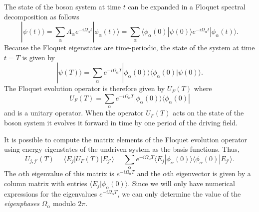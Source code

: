 The  state of the boson system at time $t$ can be expanded in a Floquet spectral decomposition as follows
%
\begin{equation}
|\psi(t)\rangle = \sum_{\alpha}A_{\alpha}e^{-i\Omega_{\alpha}t}|\phi_{\alpha}(t)\rangle
= \sum_{\alpha}\langle \phi_{\alpha}(0)|\psi(0)\rangle e^{-i\Omega_{\alpha}t}|\phi_{\alpha}(t)\rangle .
\end{equation}
%
Because the Floquet eigenstates are time-periodic, the state of the system at time $t=T$ is given by
%
\begin{equation}
|\psi(T)\rangle = \sum_{\alpha} e^{-i\Omega_{\alpha}T}|\phi_{\alpha}(0)\rangle\langle \phi_{\alpha}(0)|\psi(0)\rangle .
\end{equation}
%
The Floquet evolution operator is therefore given  by $U_F(T)$ where
\begin{equation}
U_F(T) = \sum_{\alpha} e^{-i\Omega_{\alpha}T}|\phi_{\alpha}(0)\rangle\langle \phi_{\alpha}(0)|
\end{equation}
%
and is a unitary operator.  When the operator $U_F(T)$ acts on the state of the boson system it evolves it forward in time by one period of the driving field.

It is possible to compute the matrix elements of the Floquet evolution operator using energy eigenstates of the undriven system as the basis functions. Thus, 
%
\begin{equation}
U_{j,j'}(T) = \langle E_j|U_F(T)|E_{j'}\rangle 
= \sum_{\alpha} e^{-i\Omega_{\alpha}T}\langle E_j|\phi_{\alpha}(0)\rangle\langle \phi_{\alpha}(0)|E_{j'}\rangle.
\label{eq:Floquet_mat}
\end{equation}
%
The $\alpha$th eigenvalue of this matrix is $e^{-i\Omega_{\alpha}T}$ and the $\alpha$th eigenvector is given by a column matrix  with entries ${\langle}E_j|\phi_{\alpha}(0)\rangle$. Since we will only have numerical expressions for the eigenvalues $e^{-i\Omega_{\alpha}T}$, we can only determine the value of the \textit{eigenphases} $\Omega_{\alpha}$   modulo $2\pi$.

